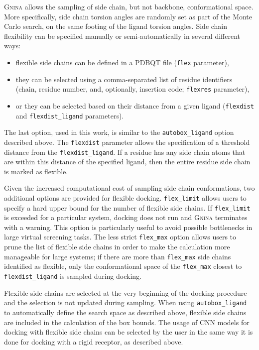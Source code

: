 \documentclass[linenumbers,doublespacing]{bmcart}
\begin{document}
\textsc{Gnina} allows the sampling of side chain, but not backbone, conformational space. More specifically, side chain torsion angles are randomly set as part of the Monte Carlo search, on the same footing of the ligand torsion angles. Side chain flexibility can be specified manually or semi-automatically in several different ways: 
\begin{itemize}
    \item flexible side chains can be defined in a PDBQT file (\texttt{flex} parameter),
    \item they can be selected using a comma-separated list of residue identifiers (chain, residue number, and, optionally, insertion code; \texttt{flexres} parameter),
    \item or they can be selected based on their distance from a given ligand (\texttt{flexdist} and \texttt{flexdist\_ligand} parameters).
\end{itemize}
The last option, used in this work, is similar to the \texttt{autobox\_ligand} option described above. The \texttt{flexdist} parameter allows the specification of a threshold distance from the \texttt{flexdist\_ligand}. If a residue has any side chain atoms that are within this distance of the specified ligand, then the entire residue side chain is marked as flexible. 

Given the increased computational cost of sampling side chain conformations, two additional options are provided for flexible docking. \texttt{flex\_limit} allows users to specify a hard upper bound for the number of flexible side chains. If \texttt{flex\_limit} is exceeded for a particular system, docking does not run and \textsc{Gnina} terminates with a warning. This option is particularly useful to avoid possible bottlenecks in large virtual screening tasks. The less strict \texttt{flex\_max} option allows users to prune the list of flexible side chains in order to make the calculation more manageable for large systems; if there are more than \texttt{flex\_max} side chains identified as flexible, only the conformational space of the \texttt{flex\_max} closest to \texttt{flexdist\_ligand} is sampled during docking.

Flexible side chains are selected at the very beginning of the docking procedure and the selection is not updated during sampling. When using \texttt{autobox\_ligand} to automatically define the search space as described above, flexible side chains are included in the calculation of the box bounds. The usage of CNN models for docking with flexible side chains can be selected by the user in the same way it is done for docking with a rigid receptor, as described above.
\end{document}

